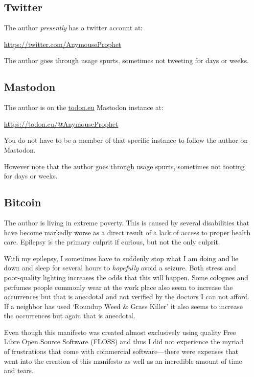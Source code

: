 \subsection{Twitter}

The author \emph{presently} has a twitter account at:

\bigskip

\url{https://twitter.com/AnymouseProphet}

\bigskip

The author goes through usage spurts, sometimes not tweeting for days or weeks.

\subsection{Mastodon}

The author is on the \url{todon.eu} Mastodon instance at:

\bigskip

\url{https://todon.eu/@AnymouseProphet}

\bigskip

You do not have to be a member of that specific instance to follow the author on Mastodon.

However note that the author goes through usage spurts, sometimes not tooting for days or weeks.

\subsection{Bitcoin}

The author is living in extreme poverty. This is caused by several disabilities that have become markedly worse as a direct result of a lack of access to proper health care. Epilepsy is the primary culprit if curious, but not the only culprit.

With my epilepsy, I sometimes have to suddenly stop what I am doing and lie down and sleep for several hours to \emph{hopefully} avoid a seizure. Both stress and poor-quality lighting increases the odds that this will happen. Some colognes and perfumes people commonly wear at the work place also seem to increase the occurrences but that is anecdotal and not verified by the doctors I can not afford. If a neighbor has used `Roundup\textregistered{} Weed \& Grass Killer' it also seems to increase the occurrences but again that is anecdotal.

Even though this manifesto was created almost exclusively using quality Free Libre Open Source Software (FLOSS) and thus I did not experience the myriad of frustrations that come with commercial software---there were expenses that went into the creation of this manifesto as well as an incredible amount of time and tears.

